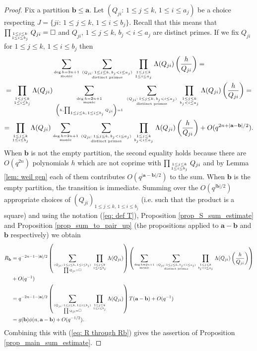 \documentclass[10pt,a4paper]{amsart}
\begin{document}
\begin{proof}
Fix a partition $\mathbf b\le \mathbf a$. Let $(Q_{ji}:\,1\le j\le k,\,1\le i\le a_j)$ be a choice respecting $J=\{ji:\,1\le j\le k,\,1\le i\le b_j\}.$ Recall that this means that $\prod_{1\le j\le k\atop{1\le i\le b_j}}Q_{ji}=\square$ and $Q_{ji},\,1\le j\le k,\,b_j< i\le a_j$ are distinct primes. If we fix $Q_{ji}$ for $1\le j\le k,\,1\le i\le b_j$ then 
\begin{multline*}
\sum_{\deg h=2n+1\atop{\text{monic}}}\sum_{(Q_{ji}:\,1\le j\le k,\,b_j<i\le a_j)\atop{\text{distinct primes}}}\prod_{1\le j\le k\atop{1\le i\le a_j}}\Lambda(Q_{ji})\left(\frac{h}{Q_{ji}}\right)=
\\=\prod_{1\le j\le k\atop{1\le i\le b_j}}\Lambda(Q_{ji})\sum_{\deg h=2n+1\atop{\text{monic}\atop{\left(h,\prod_{1\le j\le k,\,1\le i\le b_j} Q_{ji}\right)=1}}}\sum_{(Q_{ji}:\,1\le j\le k,\,b_j<i\le a_j)\atop{\text{distinct primes}}}
\prod_{1\le j\le k\atop{b_j<i\le a_j}}\Lambda(Q_{ji})\left(\frac{h}{Q_{ji}}\right)=\\
=\prod_{1\le j\le k\atop{1\le i\le b_j}}\Lambda(Q_{ji})\sum_{\deg h=2n+1\atop{\text{monic}}}\sum_{(Q_{ji}:\,1\le j\le k,\, b_j<i\le a_j)\atop{\text{distinct primes}}}\prod_{1\le j\le k\atop{b_j<i\le a_j}}\Lambda(Q_{ji})\left(\frac{h}{Q_{ji}}\right)+O(q^{2n+|\mathbf a-\mathbf b|/2}).
\end{multline*}
When $\mathbf b$ is not the empty partition, the second equality holds because there are $O(q^{2n})$ polynomials $h$ which are not coprime with $\prod_{1\le j\le k\atop{1\le i\le b_j}}Q_{ji}$ and by Lemma \ref{lem: weil gen} each of them contributes $O(q^{|\mathbf a-\mathbf b|/2})$ to the sum. When $\mathbf b$ is the empty partition, the transition is immediate. Summing over the $O(q^{|\mathbf b|/2})$ appropriate choices of $(Q_{ji})_{1\le j\le k,\,1\le i\le b_j}$ (i.e. such that the product is a square) and using the notation (\ref{eq: def T}), Proposition \ref{prop_S_sum_estimate} and Proposition \ref{prop_sum_to_pair_up} (the propositions applied to $\mathbf a-\mathbf b$ and $\mathbf b$ respectively) we obtain
\begin{align*}
R_{\mathbf b}&=q^{-2n-1-|\mathbf a|/2}\left(\sum_{(Q_{ji}:\,1\le j\le k,\,1\le i\le b_j)\atop\prod Q_{ji}=\square}\prod_{1\le j\le k\atop{1\le i\le b_j}}\Lambda(Q_{ji})\right)\left(\sum_{\deg h=2n+1\atop{\text{monic}}}\sum_{(Q_{ji}:\,1\le j\le k,\,b_j<i\le a_j)\atop{\text{distinct primes}}}\prod_{1\le j\le k\atop{b_j<i\le a_j}}\Lambda(Q_{ji})\left(\frac{h}{Q_{ji}}\right)\right)\\&+O(q^{-1})
\\&=
q^{-2n-1-|\mathbf a|/2}\left(\sum_{(Q_{ji}:\,1\le j\le k,\,1\le i\le b_j)\atop\prod {Q_{ji}}=\square}\prod_{1\le j\le k\atop{1\le i\le b_j}}\Lambda(Q_{ji})\right)T(\mathbf a-\mathbf b)+O(q^{-1})
\\&=g(\mathbf b)\phi(n,\mathbf a-\mathbf b)+O(q^{-1/2}).\end{align*}
Combining this with (\ref{eq: R through Rb}) gives the assertion of Proposition \ref{prop_main_sum_estimate}.\end{proof}
\end{document}
